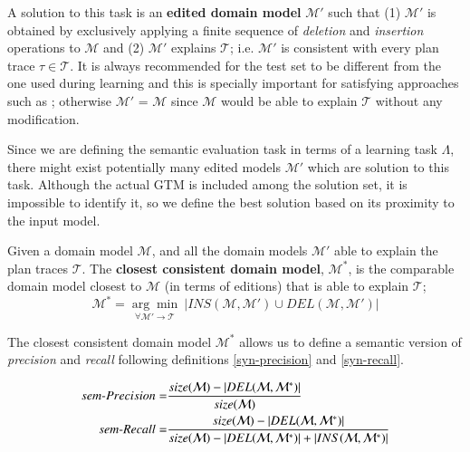 A solution to this task is an \textbf{edited domain model} $\mathcal{M'}$ such that (1) $\mathcal{M'}$ is obtained by exclusively applying a finite sequence of \emph{deletion} and \emph{insertion} operations to $\mathcal{M}$ and (2) $\mathcal{M'}$ explains $\mathcal{T}$; i.e. $\mathcal{M'}$ is consistent with every plan trace $\tau\in\mathcal{T}$. It is always recommended for the test set to be different from the one used during learning and this is specially important for satisfying approaches such as \FAMA; otherwise $\mathcal{M'}$ = $\mathcal{M}$ since $\mathcal{M}$ would be able to explain $\mathcal{T}$ without any modification.

Since we are defining the semantic evaluation task in terms of a learning task $\Lambda$, there might exist potentially many edited models $\mathcal{M'}$ which are solution to this task. Although the actual GTM is included among the solution set, it is impossible to identify it, so we define the best solution based on its proximity to the input model.

\begin{mydefinition} \label{compliant}
  Given a domain model $\mathcal{M}$, and all the domain models $\mathcal{M'}$ able to explain the plan traces $\mathcal{T}$. The {\bf closest consistent domain model}, $\mathcal{M^*}$, is the comparable domain model closest to $\mathcal{M}$ (in terms of editions) that is able to explain $\mathcal{T}$;
  \[\mathcal{M^*}=\underset{\forall \mathcal{M}' \rightarrow \mathcal{T}}{\arg\min} \ \left| INS(\mathcal{M},\mathcal{M'}) \cup DEL(\mathcal{M},\mathcal{M'}) \right|\]
\end{mydefinition}


The closest consistent domain model $\mathcal{M^*}$ allows us to define a semantic version of {\em precision} and {\em recall} following definitions \ref{syn-precision} and \ref{syn-recall}.


\begin{small}
	\begin{align*}
	sem\text{-}Precision=&\frac{size(\mathcal{M})- \left|DEL(\mathcal{M},\mathcal{M^*})\right|}{size(\mathcal{M})}\\
    \vspace{0.5cm}
	sem\text{-}Recall=&\frac{size(\mathcal{M})- \left|DEL(\mathcal{M},\mathcal{M^*})\right|}{size(\mathcal{M}) - \left|DEL(\mathcal{M},\mathcal{M^*})\right| + \left|INS(\mathcal{M},\mathcal{M^*})\right|}
	\end{align*}
\end{small}


